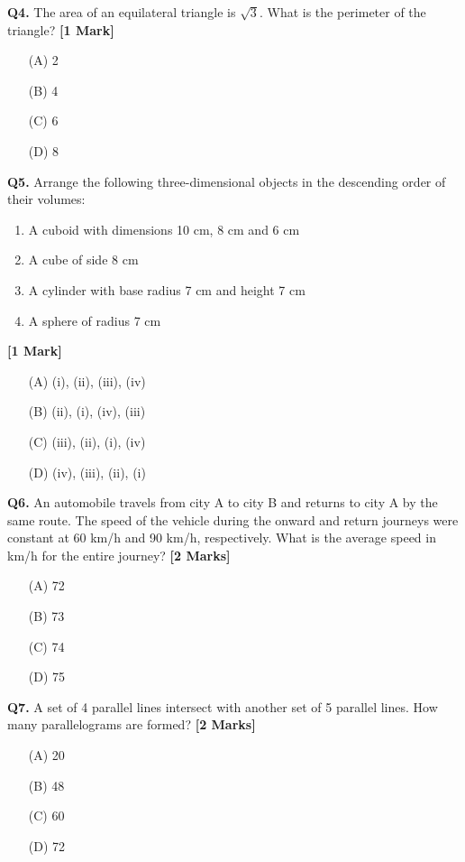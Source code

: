 \documentclass[11pt]{article}
\newcommand{\questiona}[2]{
    \noindent\textbf{Q#2.} #1 \hfill \textbf{[1 Mark]}
}
\newcommand{\questionb}[2]{
    \noindent\textbf{Q#2.} #1 \hfill \textbf{[2 Marks]}
}
\begin{document}
\questiona{The area of an equilateral triangle is \(\sqrt{3}\). What is the perimeter of the triangle?}{4}
\begin{enumerate}
    \item[(A)] 2  
    \item[(B)] 4  
    \item[(C)] 6  
    \item[(D)] 8  
\end{enumerate}
\vspace{0.5cm}

\questiona{Arrange the following three-dimensional objects in the descending order of their volumes:
\begin{enumerate}
    \item A cuboid with dimensions 10 cm, 8 cm and 6 cm
    \item A cube of side 8 cm
    \item A cylinder with base radius 7 cm and height 7 cm
    \item A sphere of radius 7 cm
\end{enumerate}}{5}
\begin{enumerate}
    \item[(A)] (i), (ii), (iii), (iv)
    \item[(B)] (ii), (i), (iv), (iii)
    \item[(C)] (iii), (ii), (i), (iv)
    \item[(D)] (iv), (iii), (ii), (i)
\end{enumerate}
\vspace{0.5cm}

\questionb{An automobile travels from city A to city B and returns to city A by the same route. The speed of the vehicle during the onward and return journeys were constant at 60 km/h and 90 km/h, respectively. What is the average speed in km/h for the entire journey?}{6}
\begin{enumerate}
    \item[(A)] 72  
    \item[(B)] 73  
    \item[(C)] 74  
    \item[(D)] 75  
\end{enumerate}
\vspace{0.5cm}

\questionb{A set of 4 parallel lines intersect with another set of 5 parallel lines. How many parallelograms are formed?}{7}
\begin{enumerate}
    \item[(A)] 20  
    \item[(B)] 48  
    \item[(C)] 60  
    \item[(D)] 72  
\end{enumerate}
\vspace{0.5cm}
\end{document}
